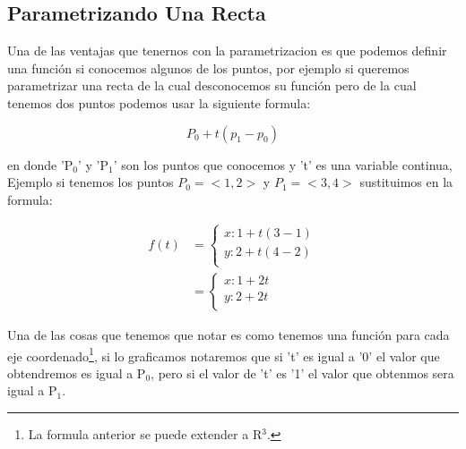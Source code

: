 \documentclass{article}
\begin{document}
\subsection{Parametrizando Una Recta}
\label{sec:orgf199ffa}
Una de las ventajas que tenernos con la parametrizacion es que podemos definir una función si conocemos algunos de los puntos, por ejemplo si queremos parametrizar una recta de la cual desconocemos su función pero de la cual tenemos dos puntos podemos usar la siguiente formula:

\[
P_0 + t(p_1 - p_0)
\]

en donde 'P\(_{\text{0}}\)' y 'P\(_{\text{1}}\)' son los puntos que conocemos y 't' es una variable continua, Ejemplo si tenemos los puntos \(P_0 = <1,2>\) y \(P_1 = <3,4>\) sustituimos en la formula:

\[ \begin{aligned} f(t) &= \begin{cases}
  x: 1 + t (3-1) \\
  y: 2 + t (4-2) \\
\end{cases} \\ &= \begin{cases}
  x: 1 + 2t \\
  y: 2 + 2t \\ 
\end{cases} \end{aligned} \]

Una de las cosas que tenemos que notar es como tenemos una función para cada eje coordenado\footnote{La formula anterior se puede extender a R\(^{\text{3}}\).}, si lo graficamos notaremos que si 't' es igual a '0' el valor que obtendremos es igual a P\(_{\text{0}}\), pero si el valor de 't' es '1' el valor que obtenmos sera igual a P\(_{\text{1}}\).
\end{document}
